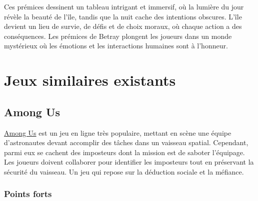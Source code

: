\documentclass[
	article,			%
	11pt,				%
	oneside,			%
	a4paper,			%
	chapter=TITLE,
	french,			%
	sumario=tradicional
	]{base_nt}
\begin{document}
Ces prémices dessinent un tableau intrigant et immersif, où la lumière du jour révèle la beauté de l'île, tandis que la nuit cache des intentions obscures. L'île devient un lieu de survie, de défis et de choix moraux, où chaque action a des conséquences. Les prémices de Betray plongent les joueurs dans un monde mystérieux où les émotions et les interactions humaines sont à l'honneur.

\section{Jeux similaires existants}

\subsection{Among Us}

\begin{exemplo}
    \href{https://fr.wikipedia.org/wiki/Among_Us}{Among Us} est un jeu en ligne très populaire, mettant en scène une équipe d'astronautes devant accomplir des tâches dans un vaisseau spatial. Cependant, parmi eux se cachent des imposteurs dont la mission est de saboter l'équipage. Les joueurs doivent collaborer pour identifier les imposteurs tout en préservant la sécurité du vaisseau. Un jeu qui repose sur la déduction sociale et la méfiance.
\end{exemplo}

\subsubsection{Points forts}
\end{document}
